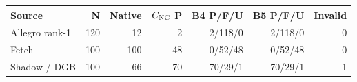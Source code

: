 \begin{tabular}{lrrrrrr}\toprule
Source & N & Native & $C_{\mathrm{NC}}$ P & B4 P/F/U & B5 P/F/U & Invalid\\\midrule
Allegro rank-1 & 120 & 12 & 2 & 2/118/0 & 2/118/0 & 0\\
Fetch & 100 & 100 & 48 & 0/52/48 & 0/52/48 & 0\\
Shadow / DGB & 100 & 66 & 70 & 70/29/1 & 70/29/1 & 1\\
\bottomrule\end{tabular}
